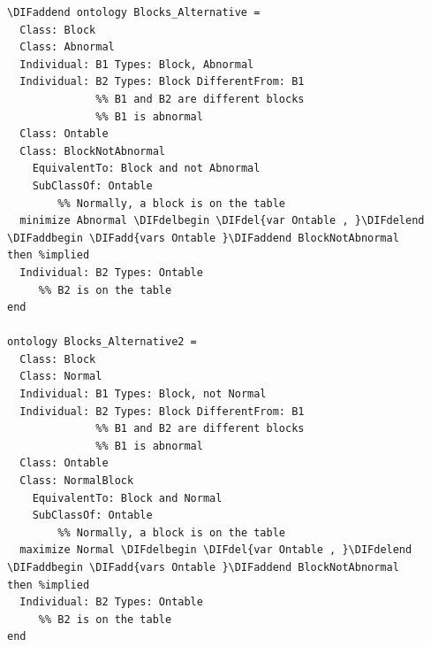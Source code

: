 \documentclass[10pt,fleqn,final]{scrreprt}
\providecommand{\DIFadd}[1]{{\protect\color{blue}\uwave{#1}}} %
\providecommand{\DIFdel}[1]{{\protect\color{red}\sout{#1}}}                      %
\providecommand{\DIFaddbegin}{} %
\providecommand{\DIFaddend}{} %
\providecommand{\DIFdelbegin}{} %
\providecommand{\DIFdelend}{} %
\begin{document}
\DIFdelbegin %
\DIFdelend \DIFaddbegin \begin{lstlisting}[language=dolText,alsolanguage=OWL2manchester]
\DIFaddend ontology Blocks_Alternative =
  Class: Block
  Class: Abnormal
  Individual: B1 Types: Block, Abnormal
  Individual: B2 Types: Block DifferentFrom: B1
              %% B1 and B2 are different blocks
              %% B1 is abnormal
  Class: Ontable 
  Class: BlockNotAbnormal 
  	EquivalentTo: Block and not Abnormal 
	SubClassOf: Ontable 
        %% Normally, a block is on the table
  minimize Abnormal \DIFdelbegin \DIFdel{var Ontable , }\DIFdelend \DIFaddbegin \DIFadd{vars Ontable }\DIFaddend BlockNotAbnormal
then %implied
  Individual: B2 Types: Ontable
     %% B2 is on the table
end

ontology Blocks_Alternative2 =
  Class: Block
  Class: Normal
  Individual: B1 Types: Block, not Normal
  Individual: B2 Types: Block DifferentFrom: B1
              %% B1 and B2 are different blocks
              %% B1 is abnormal
  Class: Ontable 
  Class: NormalBlock
  	EquivalentTo: Block and Normal 
	SubClassOf: Ontable 
        %% Normally, a block is on the table
  maximize Normal \DIFdelbegin \DIFdel{var Ontable , }\DIFdelend \DIFaddbegin \DIFadd{vars Ontable }\DIFaddend BlockNotAbnormal
then %implied
  Individual: B2 Types: Ontable
     %% B2 is on the table
end
\end{lstlisting}
\end{document}

